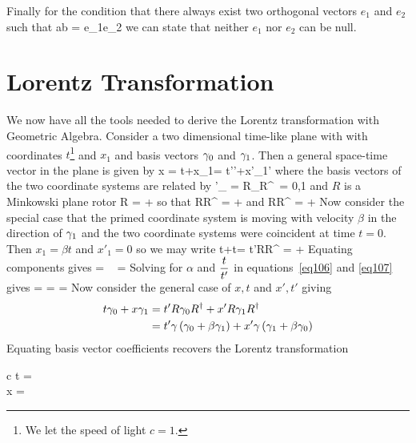 Finally for the condition that there always exist two orthogonal vectors $e_{1}$ and $e_{2}$ such that
\be
	a\w b = e_{1}e_{2}
\ee
we can state that neither $e_{1}$ nor $e_{2}$ can be null.
\section{Lorentz Transformation}
We now have all the tools needed to derive the Lorentz transformation with Geometric Algebra. Consider a two
dimensional time-like plane with with coordinates $t$\footnote{We let the speed of light $c=1$.} 
and $x_{1}$ and basis vectors $\gamma_{0}$ and $\gamma_{1}$. Then a general space-time vector in the plane is given by
\be
	x = t\gO+x_{1}\gl = t'\gO'+x'_{1}\gl'
\ee 
where the basis vectors of the two coordinate systems are related by
\be
	\gamma'_{\mu} = R\gamma_{\mu}R^{\R}\ \mu = 0,1
\ee
and $R$ is a Minkowski plane rotor
\be
	R = \sinhf{\alphah}+\coshf{\alphah}\gl\gO
\ee
so that
\be
	R\gO R^{\R} = \coshf{\alpha}\gO+\sinhf{\alpha}\gl
\ee
and
\be
	R\gl R^{\R} = \coshf{\alpha}\gl+\sinhf{\alpha}\gO
\ee
Now consider the special case that the primed coordinate system is moving with velocity $\beta$ in the
direction of $\gamma_{1}$ and the two coordinate systems were coincident at time $t = 0$. Then $x_{1} = \beta t$ 
and $x'_{1} = 0$ so we may write
\be
	t\gO+\beta t\gl = t'R\gO R^{\R}
\ee
\be
	\paren{\gO+\beta\gl} = \coshf{\alpha}\gO+\sinhf{\alpha}\gl 
\ee
Equating components gives
\be\label{eq106}
	\coshf{\alpha} = \
\ee
\be\label{eq107}
	\sinhf{\alpha} = \beta
\ee
Solving for $\alpha$ and $\displaystyle\frac{t}{t'}$ in equations~\ref{eq106} and \ref{eq107} gives
\be
	\tanhf{\alpha} = \beta
\ee
\be
	 = \gamma = 
\ee
Now consider the general case of $x,t$ and $x',t'$ giving
\begin{align}
t\gamma_{0}+x\gamma_{1} &= t'R\gamma_{0} R^{\dagger}+x'R\gamma_{1} R^{\dagger} \\
          &= t'\gamma\left ( {\gamma_{0}+\beta\gamma_{1}} \right )+x'\gamma\left ( {\gamma_{1}+\beta\gamma_{0}} \right )
\end{align}
Equating basis vector coefficients recovers the Lorentz transformation
\be
\begin{array}{c}
	t = \gamma{} \\
	x = \gamma{} 
\end{array}
\ee
